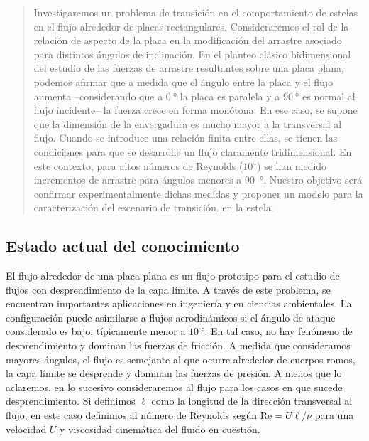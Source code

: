 \documentclass[spanish]{article}
\begin{document}
	\begin{abstract}
		Investigaremos un problema de transición en el comportamiento de estelas en el flujo alrededor de placas rectangulares. Consideraremos el rol de la relación de aspecto de la placa en la modificación del arrastre asociado para distintos ángulos de inclinación. 
		En el planteo clásico bidimensional del estudio de las fuerzas de arrastre resultantes sobre una placa plana, podemos afirmar que a medida que el ángulo entre la placa y el flujo aumenta --considerando que a $\SI{0}{\degree}$ la placa es paralela  y a $\SI{90}{\degree}$ es normal al flujo incidente-- la fuerza crece en forma monótona. En ese caso, se supone que la dimensión de la envergadura es mucho mayor a la transversal al flujo.  Cuando se introduce una relación finita entre ellas, se tienen las condiciones para que se desarrolle un flujo claramente tridimensional. En este contexto, para altos números de Reynolds ($10^4$) se han medido incrementos de arrastre para ángulos menores a \SI{90}{\degree}. Nuestro objetivo será confirmar experimentalmente dichas medidas y proponer un modelo para la caracterización del escenario de transición.
		 en la estela.
	\end{abstract}
	
	\subsection*{Estado actual del conocimiento}
	
	El flujo alrededor de una placa plana es un flujo prototipo para el estudio de flujos con desprendimiento de la capa límite. A través de este problema, se encuentran importantes aplicaciones en ingeniería y en ciencias ambientales. La configuración puede asimilarse a flujos aerodinámicos si el ángulo  de ataque considerado es bajo, típicamente menor a $\SI{10}{\degree}$.	En tal caso, no hay fenómeno de desprendimiento y dominan las fuerzas de fricción. A medida que consideramos mayores ángulos, el flujo es semejante al que ocurre alrededor de cuerpos romos, la capa límite se desprende y dominan las fuerzas de presión. A menos que lo aclaremos, en lo sucesivo consideraremos al flujo para los casos en que sucede desprendimiento. Si definimos $\ell$ como la longitud de la dirección transversal al flujo, en este caso definimos al número de Reynolds según $\mathrm{Re}=U\ell/\nu$ para una velocidad $U$ y viscosidad cinemática del fluido en cuestión.
	
\end{document}
